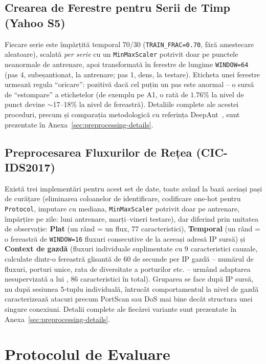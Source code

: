 \subsection{Crearea de Ferestre pentru Serii de Timp (Yahoo S5)}

Fiecare serie este împărțită temporal 70/30 (\texttt{TRAIN\_FRAC=0.70}, fără amestecare aleatoare), scalată \emph{per serie} cu un \texttt{MinMaxScaler} potrivit doar pe punctele neanormale de antrenare, apoi transformată în ferestre de lungime \texttt{WINDOW=64} (pas 4, subeșantionat, la antrenare; pas 1, dens, la testare). Eticheta unei ferestre urmează regula \enquote{oricare}: pozitivă dacă cel puțin un pas este anormal -- o sursă de \enquote{estompare} a etichetelor (de exemplu pe A1, o rată de $1.76\%$ la nivel de punct devine $\sim$17--18\% la nivel de fereastră). Detaliile complete ale acestei proceduri, precum și comparația metodologică cu referința DeepAnt~\parencite{munir2019deepant}, sunt prezentate în Anexa~\ref{sec:preprocessing-details}.

\subsection{Preprocesarea Fluxurilor de Rețea (CIC-IDS2017)}

Există trei implementări pentru acest set de date, toate având la bază aceiași pași de curățare (eliminarea coloanelor de identificare, codificare one-hot pentru \texttt{Protocol}, imputare cu mediana, \texttt{MinMaxScaler} potrivit doar pe antrenare, împărțire pe zile: luni antrenare, marți--vineri testare), dar diferind prin unitatea de observație: \textbf{Plat} (un rând = un flux, 77 caracteristici), \textbf{Temporal} (un rând = o fereastră de \texttt{WINDOW=16} fluxuri consecutive de la aceeași adresă IP sursă) și \textbf{Context de gazdă} (fluxuri individuale suplimentate cu 9 caracteristici cauzale, calculate dintr-o fereastră glisantă de 60 de secunde per IP gazdă -- numărul de fluxuri, porturi unice, rata de diversitate a porturilor etc. -- urmând adaptarea nesupervizată a lui \textcite{raskovalov2024nids}, 86 caracteristici în total). Gruparea se face după IP sursă, nu după sesiunea 5-tuplu individuală, întrucât comportamentul la nivel de gazdă caracterizează atacuri precum PortScan sau DoS mai bine decât structura unei singure conexiuni. Detalii complete ale fiecărei variante sunt prezentate în Anexa~\ref{sec:preprocessing-details}.


\section{Protocolul de Evaluare}
\label{sec:eval-protocol}

